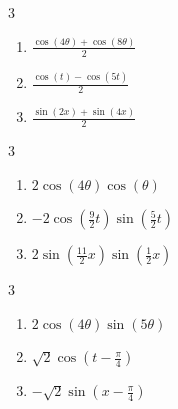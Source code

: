 \documentclass{ximera}
\begin{document}
\begin{multicols}{3}

\begin{enumerate}

\setcounter{enumi}{\value{HW}}

\item $\frac{\cos(4\theta) + \cos(8\theta)}{2}$
\item  $\frac{\cos(t) - \cos(5t)}{2}$
\item  $\frac{\sin(2x) + \sin(4x)}{2}$

\setcounter{HW}{\value{enumi}}

\end{enumerate}

\end{multicols}

\begin{multicols}{3}

\begin{enumerate}

\setcounter{enumi}{\value{HW}}

\item $2\cos(4\theta)\cos(\theta)$
\item $-2\cos \left( \frac{9}{2}t \right) \sin \left( \frac{5}{2}t \right)$
\item $2\sin \left( \frac{11}{2}x \right) \sin \left( \frac{1}{2}x \right)$

\setcounter{HW}{\value{enumi}}

\end{enumerate}

\end{multicols}

\begin{multicols}{3}

\begin{enumerate}

\setcounter{enumi}{\value{HW}}

\item $2\cos(4\theta)\sin(5\theta)$
\item $\sqrt{2}\cos \left(t - \frac{\pi}{4} \right)$
\item $-\sqrt{2}\sin \left(x - \frac{\pi}{4} \right)$

\setcounter{HW}{\value{enumi}}

\end{enumerate}

\end{multicols}
\end{document}

